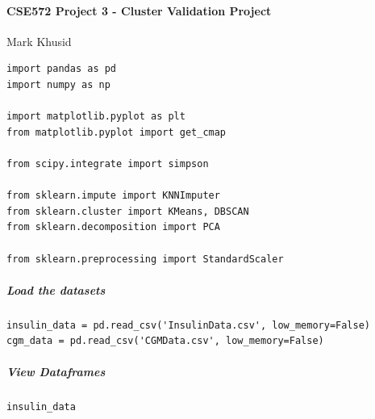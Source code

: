 \paragraph{CSE572 Project 3 - Cluster Validation Project}

Mark Khusid

\begin{verbatim}
import pandas as pd
import numpy as np

import matplotlib.pyplot as plt
from matplotlib.pyplot import get_cmap

from scipy.integrate import simpson

from sklearn.impute import KNNImputer
from sklearn.cluster import KMeans, DBSCAN
from sklearn.decomposition import PCA

from sklearn.preprocessing import StandardScaler
\end{verbatim}

\subparagraph{Load the datasets}

\begin{verbatim}
insulin_data = pd.read_csv('InsulinData.csv', low_memory=False)
cgm_data = pd.read_csv('CGMData.csv', low_memory=False)
\end{verbatim}

\subparagraph{View Dataframes}

\begin{verbatim}
insulin_data
\end{verbatim}

